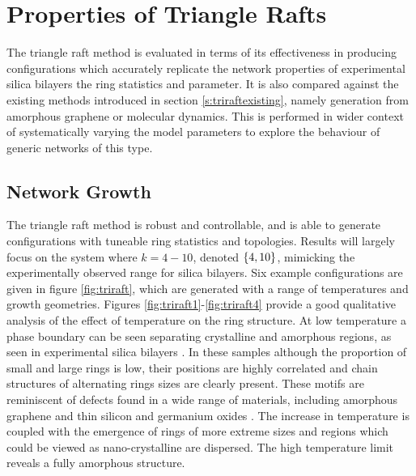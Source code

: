 \section{Properties of Triangle Rafts}

The triangle raft method is evaluated in terms of its effectiveness in producing configurations which accurately replicate the network properties of experimental silica bilayers \ie{} the ring statistics and \aw{} parameter.
It is also compared against the existing methods introduced in section \ref{s:triraftexisting}, namely generation from amorphous graphene or molecular dynamics.
This is performed in wider context of systematically varying the model parameters to explore the behaviour of generic networks of this type.

\subsection{Network Growth}
 
The triangle raft method is robust and controllable, and is able to generate configurations with tuneable ring statistics and topologies.
Results will largely focus on the system where $k=4-10$, denoted $\left\{4,10\right\}$, mimicking the experimentally observed range for silica bilayers. 
Six example configurations are given in figure \ref{fig:triraft}, which are generated with a range of temperatures and growth geometries. 
Figures \ref{fig:triraft1}\--\ref{fig:triraft4} provide a good qualitative analysis of the effect of temperature on the ring structure. 
At low temperature a phase boundary can be seen separating crystalline and amorphous regions, as seen in experimental silica bilayers \cite{Lichtenstein2012b}. 
In these samples although the proportion of small and large rings is low, their positions are highly correlated and chain structures of alternating rings sizes are clearly present. 
These motifs are reminiscent of defects found in a wide range of materials, including amorphous graphene and thin silicon and germanium oxides \cite{Bjorkman2013,Robertson2012,Buchner2017,Lewandowski2018}. 
The increase in temperature is coupled with the emergence of rings of more extreme sizes and regions which could be viewed as nano\--crystalline are dispersed. 
The high temperature limit reveals a fully amorphous structure.

